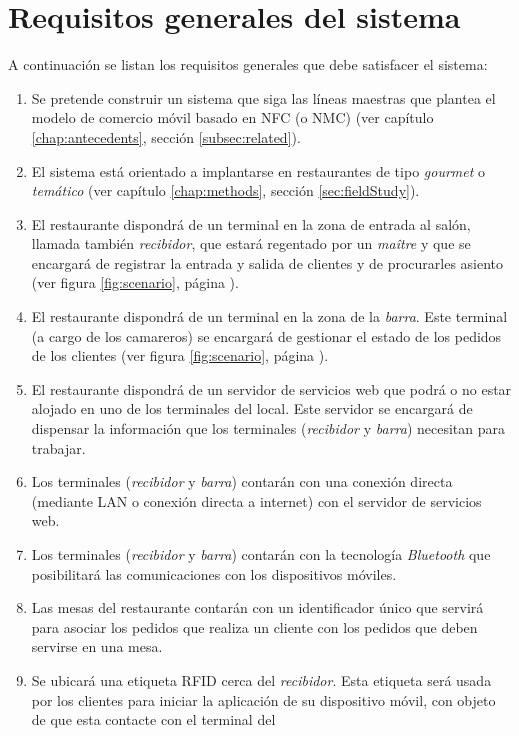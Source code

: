 \section{Requisitos generales del sistema}
A continuación se listan los requisitos generales que debe satisfacer el
sistema:
\begin{enumerate}
\item Se pretende construir un sistema que siga las líneas maestras que
plantea el modelo de comercio móvil basado en \acs{NFC} (o \acs{NMC}) (ver
capítulo \ref{chap:antecedents}, sección \ref{subsec:related}).
\item El sistema está orientado a implantarse en restaurantes de tipo
\emph{gourmet} o \emph{temático} (ver capítulo \ref{chap:methods}, sección 
\ref{sec:fieldStudy}).
\item El restaurante dispondrá de un terminal en la zona de entrada al salón,
llamada también \emph{recibidor}, que estará regentado por un \emph{maître} y
que se encargará de registrar la entrada y salida de clientes y de procurarles
asiento (ver figura \ref{fig:scenario}, página \pageref{fig:scenario}).
\item El restaurante dispondrá de un terminal en la zona de la \emph{barra}.
Este terminal (a cargo de los camareros) se encargará de gestionar el estado de
los pedidos de los clientes (ver figura \ref{fig:scenario}, página
\pageref{fig:scenario}).
\item El restaurante dispondrá de un servidor de servicios web que podrá o no
estar alojado en uno de los terminales del local. Este servidor se encargará
de dispensar la información que los terminales (\emph{recibidor} y
\emph{barra}) necesitan para trabajar.
\item Los terminales (\emph{recibidor} y \emph{barra}) contarán con una 
conexión directa (mediante \acs{LAN} o conexión directa a internet) con el
servidor de servicios web.
\item Los terminales (\emph{recibidor} y \emph{barra}) contarán con la
tecnología \emph{Bluetooth} que posibilitará las comunicaciones con los
dispositivos móviles.
\item Las mesas del restaurante contarán con un identificador único que
servirá para asociar los pedidos que realiza un cliente con los pedidos que
deben servirse en una mesa.
\item Se ubicará una etiqueta \acs{RFID} cerca del \emph{recibidor}. Esta
etiqueta será usada por los clientes para iniciar la aplicación de su
dispositivo móvil, con objeto de que esta contacte con el terminal del

\end{enumerate}
